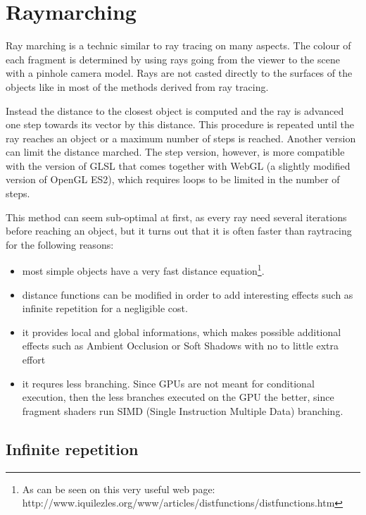 \chapter{Raymarching \label{chap:raymarching} }

Ray marching is a technic similar to ray tracing on many aspects. The colour of
each fragment is determined by using rays going from the viewer to the scene with
a pinhole camera model. Rays are not casted directly to the surfaces of the objects
like in most of the methods derived from ray tracing.

Instead the distance to the closest object is computed and the ray is advanced one step towards
its vector by this distance. This procedure is repeated
until the ray reaches an object or a maximum number of steps is reached. Another version can limit
the distance marched. The step version, however, is more compatible with the version
of GLSL that comes together with WebGL (a slightly modified version of OpenGL ES2), which requires
loops to be limited in the number of steps. 

This method can seem sub-optimal at first, as every ray need several iterations before reaching an object,
but it turns out that it is often faster than raytracing for the following reasons:
\begin{itemize}
 \item most simple objects have a very fast distance equation\footnote{As can be seen on this
 	very useful web page: http://www.iquilezles.org/www/articles/distfunctions/distfunctions.htm}.
 \item distance functions can be modified in order to add interesting effects such as
	infinite repetition for a negligible cost.
 \item it provides local and global informations, which makes possible additional effects
 	such as Ambient Occlusion or Soft Shadows with no to little extra effort
 \item it requres less branching. Since GPUs are not meant for conditional execution, then
 	the less branches executed on the GPU the better, since fragment shaders run SIMD
 	(Single Instruction Multiple Data) branching.
\end{itemize}


\section{Infinite repetition} 

